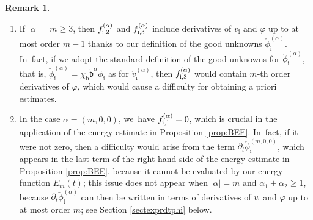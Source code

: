 \documentclass[10pt]{amsart}
\newenvironment{enumeratei}
{\bgroup\def\theenumi{\roman{enumi}}\def\theenumii{\arabic{enumii}}\begin{enumerate}}
{\end{enumerate}\egroup}
\newcommand{\dt}{\partial_t}
\newcommand{\cmfalpha}{\check{\mathfrak{d}}^{\alpha}}
\theoremstyle{definition}
\newtheorem{remark}[theorem]{Remark}
\begin{document}
\skpt
\begin{remark}\label{re:GU2}
\begin{enumeratei}
\item\label{re:GU2i}
If $|\alpha|=m\geq3$, then $f_{{\rm i},2}^{(\alpha)}$ and $f_{{\rm i},3}^{(\alpha)}$ include derivatives of $v_\mathrm{i}$ and $\varphi$ up to at most order $m-1$
thanks to our definition of the good unknowns $\check{\phi}_\mathrm{i}^{(\alpha)}$. In~fact, if we adopt the standard definition of the good unknowns for
$\check{\phi}_\mathrm{i}^{(\alpha)}$, that is, $\check{\phi}_\mathrm{i}^{(\alpha)}=\chi_\mathrm{b}\cmfalpha\phi_\mathrm{i}$ as for $\check{v}_\mathrm{i}^{(\alpha)}$,
then $f_{{\rm i},3}^{(\alpha)}$ would contain $m$-th order derivatives of $\varphi$, which would cause a difficulty for obtaining a priori estimates.

\item\label{re:GU2ii}
In the case $\alpha=(m,0,0)$, we~have $f_{{\rm i},1}^{(\alpha)}=0$, which is crucial in the application of the energy estimate in Proposition \ref{prop:BEE}. In~fact, if it were not zero, then a difficulty would arise from the term $\dt\check{\phi}_\mathrm{i}^{(m,0,0)}$,
which appears in the last term of the right-hand side of the energy estimate in Proposition \ref{prop:BEE},
because it cannot be evaluated by our energy function $E_m(t)$;
this issue does not appear when $|\alpha|=m$ and $\alpha_1+\alpha_2\geq1$,
because $\dt\check{\phi}_\mathrm{i}^{(\alpha)}$ can then be written in terms of derivatives of $v_\mathrm{i}$ and $\varphi$ up to at most order $m$;
see Section \ref{sectexprdtphi} below.
\end{enumeratei}
\end{remark}
\end{document}
